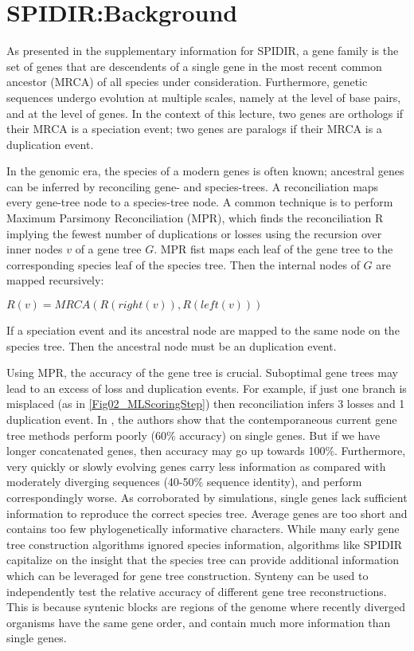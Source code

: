 \section{SPIDIR:Background} 
As presented in the supplementary information for SPIDIR, a gene
family is the set of genes that are descendents of a single gene in
the most recent common ancestor (MRCA) of all species under
consideration. Furthermore, genetic sequences undergo evolution at
multiple scales, namely at the level of base pairs, and at the level
of genes. In the context of this lecture, two genes are orthologs if
their MRCA is a speciation event; two genes are paralogs if their MRCA
is a duplication event.

In the genomic era, the species of a modern genes is often known;
ancestral genes can be inferred by reconciling gene- and
species-trees. A reconciliation maps every gene-tree node to a
species-tree node. A common technique is to perform Maximum Parsimony
Reconciliation (MPR), which finds the reconciliation R implying the
fewest number of duplications or losses using the recursion over inner
nodes $v$ of a gene tree $G$. MPR fist maps each leaf of the gene tree
to the corresponding species leaf of the species tree. Then the
internal nodes of $G$ are mapped recursively:

$R(v) = MRCA(R(right(v)),R(left(v)))$

\noindent If a speciation event and its ancestral node are mapped to the same node on the species tree. Then the ancestral node must be an duplication event.

Using MPR, the accuracy of the gene tree is crucial. Suboptimal gene
trees may lead to an excess of loss and duplication events. For
example, if just one branch is misplaced (as in
\ref{Fig02_MLScoringStep}) then reconciliation infers 3 losses and 1
duplication event. In \cite{Rasmussen}, the authors show that the
contemporaneous current gene tree methods perform poorly (60\%
accuracy) on single genes. But if we have longer concatenated genes,
then accuracy may go up towards 100\%. Furthermore, very quickly or
slowly evolving genes carry less information as compared with
moderately diverging sequences (40-50\% sequence identity), and
perform correspondingly worse. As corroborated by simulations, single
genes lack sufficient information to reproduce the correct species
tree. Average genes are too short and contains too few
phylogenetically informative characters. While many early gene tree
construction algorithms ignored species information, algorithms like
SPIDIR capitalize on the insight that the species tree can provide
additional information which can be leveraged for gene tree
construction. Synteny can be used to independently test the relative
accuracy of different gene tree reconstructions. This is because
syntenic blocks are regions of the genome where recently diverged
organisms have the same gene order, and contain much more information
than single genes.


